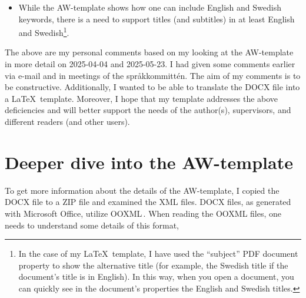 \documentclass[12pt, twoside]{article}
\begin{document}
\clearpage
\begin{itemize}[resume*, label=\color{red}]
\item While the AW-template shows how one can include English and Swedish keywords, there is a need to support titles (and subtitles) in at least English and Swedish\footnote{In the case of my \LaTeX\ template, I have used the \enquote{subject} PDF document property to show the alternative title (for example, the Swedish title if the document's title is in English). In this way, when you open a document, you can quickly see in the document's properties the English and Swedish titles.}.
\end{itemize}

The above are my personal comments based on my looking at the AW-template in more detail on 2025-04-04 and 2025-05-23. I had given some comments earlier via e-mail and in meetings of the \foreignlanguage{swedish}{språkkommittén}. The aim of my comments is to be constructive. Additionally, I wanted to be able to translate the \gls{DOCX} file into a \LaTeX\ template. Moreover, I hope that my template addresses the above deficiencies and will better support the needs of the author(s), supervisors, and different readers (and other users).


\section{Deeper dive into the AW-template}
\label{sec:cycle3DeepDive}
To get more information about the details of the AW-template, I copied the \gls{DOCX} file to a ZIP file and examined the \gls{XML} files.
\gls{DOCX} files, as generated with Microsoft Office, utilize \gls{OOXML}\,\cite{ISOIEC_29500_1:2016}. When reading the \gls{OOXML} files, one needs to understand some details of this format,
\end{document}
